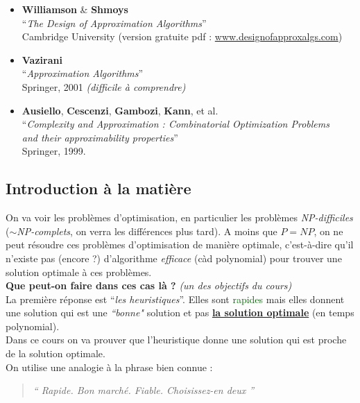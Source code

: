 \documentclass[12pt]{article}
\newcommand{\gre}[1]{\textcolor{darkgreen}{#1}}
\newcommand{\quotecolor}[1]{\textcolor{quote}{#1}}
\begin{document}
\begin{itemize}
	\item \textbf{Williamson} \& \textbf{Shmoys} \\
	``\textit{The Design of Approximation Algorithms}''\\
	Cambridge University (version gratuite pdf  : \url{www.designofapproxalgs.com})
	\item \textbf{Vazirani}\\
	``\textit{Approximation Algorithms}''\\
	Springer, 2001 \textit{(difficile à comprendre)}
	\item \textbf{Ausiello}, \textbf{Cescenzi}, \textbf{Gambozi}, \textbf{Kann}, et al.\\
	``\textit{Complexity and Approximation : Combinatorial Optimization Problems  \\\indent \hspace{4.9cm} and their
	approximability properties}''\\
	Springer, 1999.
\end{itemize}

\subsection{Introduction à la matière}

On va voir les problèmes d'optimisation, en particulier les problèmes
\textit{NP-difficiles} ($\sim$\textit{NP-complets}, on verra  les différences
plus tard). A moins que $P = NP$, on ne peut résoudre ces problèmes
d'optimisation de manière optimale, c'est-à-dire qu'il n'existe pas (encore ?)
d'algorithme \textit{efficace} (càd polynomial) pour trouver une solution
optimale à ces problèmes. \\

\textbf{Que peut-on faire dans ces cas là ?}\textit{ (un des objectifs du cours)} \\

\noindent La première réponse est ``\textit{les heuristiques}''. Elles sont
\gre{rapides} mais elles donnent une solution qui est une \textit{``bonne"}
solution et pas \textbf{\underline{la solution optimale}} (en temps
polynomial).\\ Dans ce cours on va prouver que l'heuristique donne une solution
qui est proche de la solution optimale. \\

\noindent On utilise une analogie à la phrase bien connue :
\begin{quote}\begin{center}
\textit{\quotecolor{{\Huge ``}}
Rapide. Bon marché. Fiable. Choisissez-en deux
\quotecolor{{\Huge ''}}}
\end{center}\end{quote}
\end{document}
